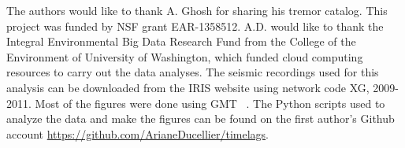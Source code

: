 \documentclass[draft]{agujournal2019}
\begin{document}
%




%
%
%
%
%
%
%
%


\acknowledgments
The authors would like to thank A. Ghosh for sharing his tremor catalog. This project was funded by NSF grant EAR-1358512. A.D. would like to thank the Integral Environmental Big Data Research Fund from the College of the Environment of University of Washington, which funded cloud computing resources to carry out the data analyses. The seismic recordings used for this analysis can be downloaded from the IRIS website using network code XG, 2009-2011. Most of the figures were done using GMT ~\cite{WES_1991}. The Python scripts used to analyze the data and make the figures can be found on the first author's Github account \url{https://github.com/ArianeDucellier/timelags}.



%
%





%
%
%
%
%
\end{document}
